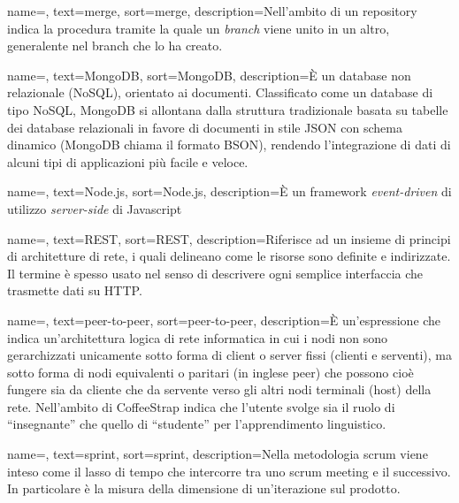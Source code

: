 {
    name=,
    text=merge,
    sort=merge,
    description={Nell'ambito di un repository indica la procedura tramite la quale un \textit{branch} viene unito in un altro, generalente nel branch che lo ha creato.}
}

{
    name=,
    text=MongoDB,
    sort=MongoDB,
    description={È un database non relazionale (NoSQL), orientato ai documenti. Classificato come un database di tipo NoSQL, MongoDB si allontana dalla struttura tradizionale basata su tabelle dei database relazionali in favore di documenti in stile JSON con schema dinamico (MongoDB chiama il formato BSON), rendendo l'integrazione di dati di alcuni tipi di applicazioni più facile e veloce.}
}

{
    name=,
    text=Node.js,
    sort=Node.js,
    description={È un framework \textit{event-driven} di utilizzo \textit{server-side} di Javascript}
}

{
    name=,
    text=REST,
    sort=REST,
    description={Riferisce ad un insieme di principi di architetture di rete, i quali delineano come le risorse sono definite e indirizzate. Il termine è spesso usato nel senso di descrivere ogni semplice interfaccia che trasmette dati su HTTP.}
}

{
    name=,
    text=peer-to-peer,
    sort=peer-to-peer,
    description={È un'espressione che indica un'architettura logica di rete informatica in cui i nodi non sono gerarchizzati unicamente sotto forma di client o server fissi (clienti e serventi), ma sotto forma di nodi equivalenti o paritari (in inglese peer) che possono cioè fungere sia da cliente che da servente verso gli altri nodi terminali (host) della rete. Nell'ambito di CoffeeStrap indica che l'utente svolge sia il ruolo di ``insegnante'' che quello di ``studente'' per l'apprendimento linguistico.}
}

{
    name=,
    text=sprint,
    sort=sprint,
    description={Nella metodologia scrum viene inteso come il lasso di tempo che intercorre tra uno scrum meeting e il successivo. In particolare è la misura della dimensione di un'iterazione sul prodotto.}
}
